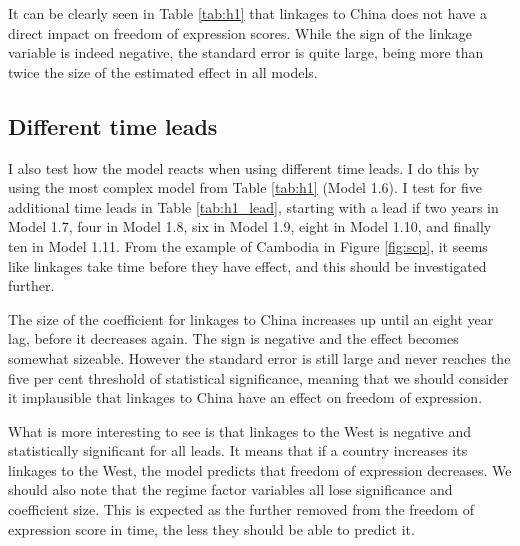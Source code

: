 It can be clearly seen in Table \ref{tab:h1} that linkages to China does not have a direct impact on freedom of expression scores. While the sign of the linkage variable is indeed negative, the standard error is quite large, being more than twice the size of the estimated effect in all models.

\subsection{Different time leads}
I also test how the model reacts when using different time leads. I do this by using the most complex model from Table \ref{tab:h1} (Model 1.6). I test for five additional time leads in Table \ref{tab:h1_lead}, starting with a lead if two years in Model 1.7, four in Model 1.8, six in Model 1.9, eight in Model 1.10, and finally ten in Model 1.11. From the example of Cambodia in Figure \ref{fig:scp}, it seems like linkages take time before they have effect, and this should be investigated further.

The size of the coefficient for linkages to China increases up until an eight year lag, before it decreases again. The sign is negative and the effect becomes somewhat sizeable. However the standard error is still large and never reaches the five per cent threshold of statistical significance, meaning that we should consider it implausible that linkages to China have an effect on freedom of expression. 

What is more interesting to see is that linkages to the West is negative and statistically significant for all leads. It means that if a country increases its linkages to the West, the model predicts that freedom of expression decreases. We should also note that the regime factor variables all lose significance and coefficient size. This is expected as the further removed from the freedom of expression score in time, the less they should be able to predict it. 


